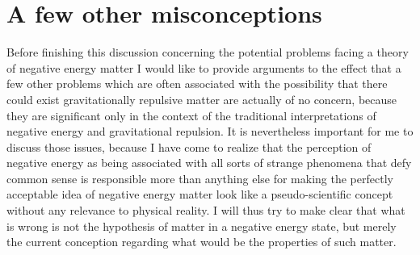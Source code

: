 \documentclass[notitlepage,12pt]{report}
\begin{document}
\section{A few other misconceptions}

Before finishing this discussion concerning the potential problems facing a theory of negative energy matter I would like to provide arguments to the effect that a few other problems which are often associated with the possibility that there could exist gravitationally repulsive matter are actually of no concern, because they are significant only in the context of the traditional interpretations of negative energy and gravitational repulsion. It is nevertheless important for me to discuss those issues, because I have come to realize that the perception of negative energy as being associated with all sorts of strange phenomena that defy common sense is responsible more than anything else for making the perfectly acceptable idea of negative energy matter look like a pseudo-scientific concept without any relevance to physical reality. I will thus try to make clear that what is wrong is not the hypothesis of matter in a negative energy state, but merely the current conception regarding what would be the properties of such matter.
\end{document}
